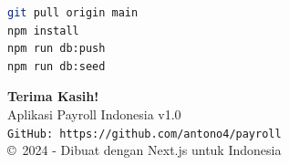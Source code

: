 \documentclass[12pt,a4paper]{article}
\begin{document}
\begin{lstlisting}[language=bash]
git pull origin main
npm install
npm run db:push
npm run db:seed
\end{lstlisting}

\newpage
\vspace*{\fill}
\begin{center}
    \textbf{\LARGE Terima Kasih!}\\
    \vspace{1cm}
    \Large Aplikasi Payroll Indonesia v1.0\\
    \vspace{0.5cm}
    \texttt{GitHub: https://github.com/antono4/payroll}\\
    \vspace{1cm}
    \copyright\ 2024 - Dibuat dengan Next.js untuk Indonesia
\end{center}
\vspace*{\fill}
\end{document}

